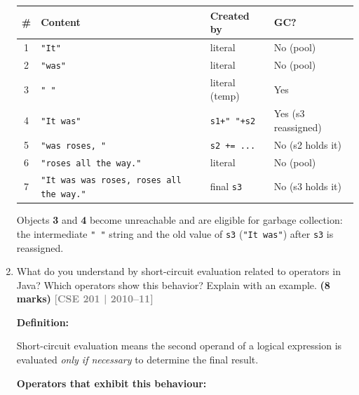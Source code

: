 \documentclass[12pt,a3paper]{article}
\newcommand{\yr}[1]{\hfill\textcolor{gray}{\small\textbf{[#1]}}}
\newcommand{\mk}[1]{\textcolor{orange!70!black}{\small\textbf{(#1 marks)}}}
\begin{document}
\begin{enumerate}
\begin{tcolorbox}
\begin{center}
\small
\begin{tabular}{@{}clll@{}}
\toprule
\textbf{\#} & \textbf{Content} & \textbf{Created by} & \textbf{GC?} \\
\midrule
1 & \texttt{"It"}                                    & literal         & No (pool) \\
2 & \texttt{"was"}                                   & literal         & No (pool) \\
3 & \texttt{" "}                                     & literal (temp)  & Yes \\
4 & \texttt{"It was"}                                & \texttt{s1+" "+s2}      & Yes (s3 reassigned) \\
5 & \texttt{"was roses, "}                           & \texttt{s2 += ...}      & No (s2 holds it) \\
6 & \texttt{"roses all the way."}                    & literal         & No (pool) \\
7 & \texttt{"It was was roses, roses all the way."}  & final \texttt{s3}        & No (s3 holds it) \\
\bottomrule
\end{tabular}
\end{center}

Objects \textbf{3} and \textbf{4} become unreachable and are eligible
for garbage collection: the intermediate \texttt{" "} string and the
old value of \texttt{s3} (\texttt{"It was"}) after \texttt{s3} is
reassigned.

\end{tcolorbox}

\item What do you understand by short-circuit evaluation related to operators in Java? Which operators show this behavior? Explain with an example. \mk{8}
\yr{CSE 201 | 2010--11}

\begin{tcolorbox}[enhanced,breakable,ansbox,
  colback=cB!4,colframe=cB,boxrule=0.8pt,arc=5pt,
  title={\textbf{Answer --- Short-Circuit Evaluation in Java}},
  fonttitle=\bfseries\color{white},colbacktitle=cB]

\textbf{Definition:}

Short-circuit evaluation means the second operand of a logical
expression is evaluated \emph{only if necessary} to determine the
final result.

\textbf{Operators that exhibit this behaviour:}


\end{tcolorbox}
\end{enumerate}
\end{document}
